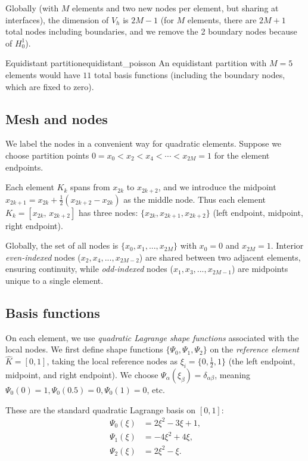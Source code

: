 \documentclass[a4paper,10pt]{article}
\begin{document}
Globally (with \(M\) elements and two new nodes per element, but sharing at interfaces), the dimension of \(V_h\) is \(2M-1\) (for \(M\) elements, there are \(2M+1\) total nodes including boundaries, and we remove the 2 boundary nodes because of \(H^1_0\)).

\begin{example}{Equidistant partition}{equidistant_poisson}
	An equidistant partition with \(M=5\) elements would have \(11\) total basis functions (including the boundary nodes, which are fixed to zero).
\end{example}

\subsection*{Mesh and nodes}
We label the nodes in a convenient way for quadratic elements.
Suppose we choose partition points \(0 = x_0 < x_2 < x_4 < \cdots < x_{2M} = 1\) for the element endpoints.

Each element \(K_k\) spans from \(x_{2k}\) to \(x_{2k+2}\), and we introduce the midpoint \(x_{2k+1} = x_{2k} + \frac{1}{2}(x_{2k+2}-x_{2k})\) as the middle node.
Thus each element \(K_k = [x_{2k},\,x_{2k+2}]\) has three nodes: \(\{x_{2k}, x_{2k+1}, x_{2k+2}\}\) (left endpoint, midpoint, right endpoint).

Globally, the set of all nodes is \(\{x_0, x_1, ..., x_{2M}\}\) with \(x_0=0\) and \(x_{2M}=1\).
Interior \emph{even-indexed} nodes (\(x_2, x_4, ..., x_{2M-2}\)) are shared between two adjacent elements, ensuring continuity, while \textit{odd-indexed} nodes (\(x_1, x_3, ..., x_{2M-1}\)) are midpoints unique to a single element.

\subsection*{Basis functions}
On each element, we use \emph{quadratic Lagrange shape functions} associated with the local nodes.
We first define shape functions \(\{\Psi_0, \Psi_1,\Psi_2\}\) on the \emph{reference element} \(\hat K = [0,1]\), taking the local reference nodes as \(\xi_i = \{0, \frac{1}{2}, 1\}\) (the left endpoint, midpoint, and right endpoint).
We choose \(\Psi_\alpha(\xi_\beta) = \delta_{\alpha\beta}\), meaning \(\Psi_0(0)=1, \Psi_0(0.5)=0, \Psi_0(1)=0\), etc.

These are the standard quadratic Lagrange basis on \([0,1]\):
\begin{align*}
	\Psi_0(\xi) & = 2\xi^2 - 3\xi + 1, \\
	\Psi_1(\xi) & = -4\xi^2 + 4\xi,    \\
	\Psi_2(\xi) & = 2\xi^2 - \xi.
\end{align*}
\end{document}
